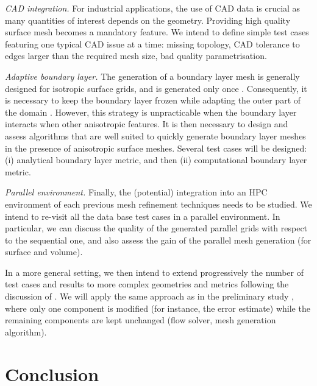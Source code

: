 \documentclass[3p,times,procedia,number]{elsarticle}
\begin{document}
\emph{CAD integration.\;}
For industrial applications, the use of CAD data is crucial as many quantities of interest
depends on the geometry. Providing high quality surface mesh becomes a mandatory feature.
We intend to define simple test cases featuring one typical CAD issue at a time: missing topology,  CAD tolerance to edges larger than the required mesh size,
bad quality parametrisation.

\emph{Adaptive boundary layer.\;}
The generation of a boundary layer mesh is generally designed for isotropic surface grids,
and is generated only once \cite{pirzadeh-advancing-layer,loseille-lohner-imr21-robust-bl-gen}.
Consequently, it is necessary to keep the boundary layer frozen while adapting
the outer part of the domain \cite{park-carlson-turbulent-output-adapt-aiaa}.
However, this strategy is unpracticable when the boundary layer
interacts when other anisotropic features.
It is then necessary to design and assess algorithms that are well suited to quickly generate boundary layer meshes
in the presence of anisotropic surface meshes. Several test cases will be designed:
(i) analytical boundary layer metric, and then (ii) computational boundary layer metric. 

\emph{Parallel environment.\;}
Finally, the (potential) integration into an HPC environment \cite{jansson-hoffman-jansson-siamjsc-2012-para-adapt-fe-cfd} of each previous mesh refinement techniques needs to be studied.
We intend to re-visit all the data base test cases in a parallel environment.
In particular,
we can discuss the quality of the generated parallel grids with respect to the sequential one,
and also assess the gain of the parallel mesh generation (for surface and volume).

In a more general setting, we then intend to extend progressively the number of test cases and results to more complex geometries and metrics
following the discussion of \cite{park-unstruct-adapt-status-cfd2030}.
We will apply the same approach as in the preliminary study \cite{park-loseille-krakos-michal-adapt-decomposition},
where only one component is modified (for instance, the error estimate) while the remaining
components are kept unchanged (flow solver, mesh generation algorithm).

\section{Conclusion}
\end{document}
